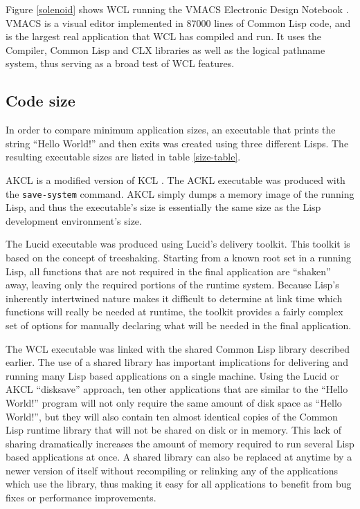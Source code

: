 Figure \ref{solenoid} shows WCL running the VMACS Electronic Design
Notebook \cite{vmacs}. VMACS is a visual editor implemented in 87000
lines of Common Lisp code, and is the largest real application that
WCL has compiled and run.  It uses the Compiler, Common Lisp and CLX
libraries as well as the logical pathname system, thus serving as a
broad test of WCL features.

\subsection{Code size}

In order to compare minimum application sizes, an executable that
prints the string ``Hello World!'' and then exits was created using
three different Lisps. The resulting executable sizes are listed in
table \ref{size-table}.

AKCL \cite{akcl} is a modified version of KCL \cite{kcl}.  The ACKL
executable was produced with the {\tt save-system} command.  AKCL
simply dumps a memory image of the running Lisp, and thus the
executable's size is essentially the same size as the Lisp development
environment's size.

The Lucid \cite{lucid} executable was produced using Lucid's delivery toolkit.
This toolkit is based on the concept of treeshaking. Starting from a known
root set in a running Lisp, all functions that are not required in
the final application are ``shaken'' away, leaving only the required
portions of the runtime system. Because Lisp's inherently intertwined
nature makes it difficult to determine at link time which functions
will really be needed at runtime, the toolkit provides a fairly
complex set of options for manually declaring what will be needed in
the final application.

The WCL executable was linked with the shared Common Lisp library
described earlier.  The use of a shared library has important
implications for delivering and running many Lisp based applications
on a single machine.  Using the Lucid or AKCL ``disksave'' approach,
ten other applications that are similar to the ``Hello World!''
program will not only require the same amount of disk space as ``Hello
World!'', but they will also contain ten almost identical copies of
the Common Lisp runtime library that will not be shared on disk or in
memory. This lack of sharing dramatically increases the amount of
memory required to run several Lisp based applications at once.  A
shared library can also be replaced at anytime by a newer version of
itself without recompiling or relinking any of the applications which
use the library, thus making it easy for all applications to benefit
from bug fixes or performance improvements.

